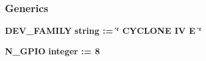 \subsubsection*{Generics}
 \begin{DoxyCompactItemize}
\item 
{\bf D\+E\+V\+\_\+\+F\+A\+M\+I\+LY} {\bfseries {\bfseries \textcolor{comment}{string}\textcolor{vhdlchar}{ }\textcolor{vhdlchar}{ }\textcolor{vhdlchar}{\+:}\textcolor{vhdlchar}{=}\textcolor{vhdlchar}{ }\textcolor{vhdlchar}{ }\textcolor{vhdlchar}{ }\textcolor{vhdlchar}{ }\textcolor{keyword}{\char`\"{} C\+Y\+C\+L\+O\+N\+E I\+V E \char`\"{}}\textcolor{vhdlchar}{ }}}
\item 
{\bf N\+\_\+\+G\+P\+IO} {\bfseries {\bfseries \textcolor{comment}{integer}\textcolor{vhdlchar}{ }\textcolor{vhdlchar}{ }\textcolor{vhdlchar}{\+:}\textcolor{vhdlchar}{=}\textcolor{vhdlchar}{ }\textcolor{vhdlchar}{ } \textcolor{vhdldigit}{8} \textcolor{vhdlchar}{ }}}
\end{DoxyCompactItemize}
